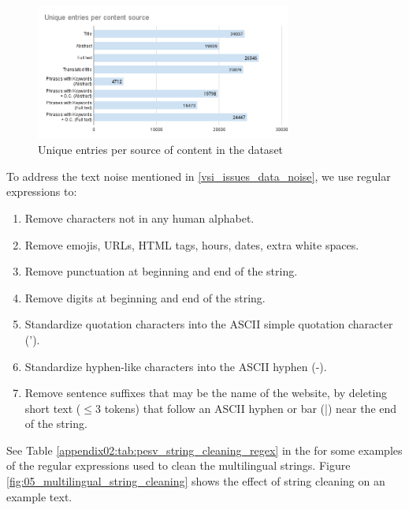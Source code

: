 \begin{figure}
    \centering
    \includegraphics[width=0.750\textwidth]{Figures/05/Unique entries per content source_keyphrases.png}
    \caption{Unique entries per source of content in the \VSI{} dataset}
    \label{fig:05_unique_entries_keyphrases_vsi}
\end{figure}


\label{vsi_data_cleaning}



\label{vsi_string_cleaning}

To address the text noise mentioned in \headerName{} \ref{vsi_issues_data_noise}, we use regular expressions to:

\begin{enumerate}
    \item Remove characters not in any human alphabet.
    \item Remove emojis, URLs, HTML tags, hours, dates, extra white spaces.
    \item Remove punctuation at beginning and end of the string.
    \item Remove digits at beginning and end of the string.
    \item Standardize quotation characters into the ASCII simple quotation character (').
    \item Standardize hyphen-like characters into the ASCII hyphen (-).
    \item Remove sentence suffixes that may be the name of the website, by deleting short text ($\leq 3$ tokens) that follow an ASCII hyphen or bar (|) near the end of the string.
\end{enumerate}

See Table \ref{appendix02:tab:pesv_string_cleaning_regex} in the \appendixname{} for some examples of the regular expressions used to clean the multilingual strings. Figure \ref{fig:05_multilingual_string_cleaning} shows the effect of string cleaning on an example text.

